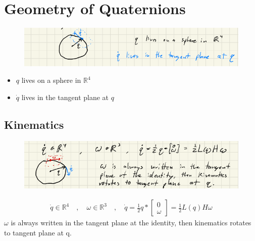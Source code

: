 \documentclass[11pt]{article}
\begin{document}
\section{Geometry of Quaternions}
\begin{figure}[H]
    \centering
    \includegraphics[width=\linewidth]{lecture_15_1.png}
\end{figure}
\begin{itemize}
    \item $q$ lives on a sphere in $\mathbb{R}^4$
    \item $\dot{q}$ lives in the tangent plane at $q$
\end{itemize}

\subsection{Kinematics}
\begin{figure}[H]
    \centering
    \includegraphics[width=\linewidth]{lecture_15_2.png}
\end{figure}
\begin{align*}
    \dot{q}\in \mathbb{R}^4 \quad,\quad \omega\in \mathbb{R}^3\quad , \quad \dot{q }= \frac{1}{2} q*\begin{bmatrix}
        0 \\ \omega
    \end{bmatrix} = \frac{1}{2}L(q)H\omega
\end{align*}
$\omega$ is always written in the tangent plane at the identity, then kinematics rotates to tangent plane at q.
\end{document}
